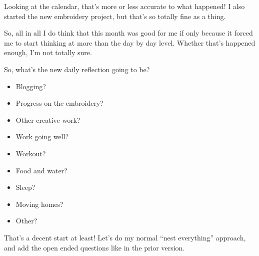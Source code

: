 \documentclass[12pt]{article}
\newcommand{\say}[1]{``#1''}
\renewcommand{\,}{\textsuperscript{,}}
\begin{document}
Looking at the calendar, that's more or less accurate to what happened! I also started the new embroidery project, but that's so totally fine as a thing.

So, all in all I do think that this month was good for me if only because it forced me to start thinking at more than the day by day level. Whether that's happened enough, I'm not totally sure.

So, what's the new daily reflection going to be?

\begin{itemize}

\item Blogging?

\item Progress on the embroidery?

\item Other creative work?

\item Work going well?

\item Workout?

\item Food and water?

\item Sleep?

\item Moving homes?

\item Other?

\end{itemize}

That's a decent start at least! Let's do my normal \say{nest everything} approach, and add the open ended questions like in the prior version.
\end{document}
